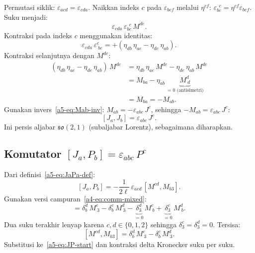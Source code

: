 \vspace{0.5em}
Permutasi siklik: $\varepsilon_{acd} = \varepsilon_{cda}$. Naikkan indeks $c$ pada $\varepsilon_{bef}$ melalui $\eta^{cf}$: $\varepsilon_{be}^{\ \ c} = \eta^{cf}\varepsilon_{bef}$. Suku menjadi:
\begin{equation}
    \varepsilon_{cda}\,\varepsilon_{be}^{\ \ c}\,M^{de}.
\end{equation}
Kontraksi pada indeks $c$ menggunakan identitas:
\begin{equation}
    \varepsilon_{cda}\,\varepsilon^{c}_{\ be} = +(\eta_{db}\,\eta_{ae} - \eta_{de}\,\eta_{ab}).
\end{equation}
Kontraksi selanjutnya dengan $M^{de}$:
\begin{align}
    (\eta_{db}\,\eta_{ae} - \eta_{de}\,\eta_{ab})\,M^{de}
    &= \eta_{db}\,\eta_{ae}\,M^{de} - \eta_{de}\,\eta_{ab}\,M^{de} \nonumber\\[4pt]
    &= M_{ba} - \eta_{ab}\,\underbrace{M^d_{\ d}}_{= 0\text{ (antisimetri)}} \nonumber\\[4pt]
    &= M_{ba} = -M_{ab}. \label{a5-eq:JJ-Mab}
\end{align}
Gunakan invers~\eqref{a5-eq:Mab-inv}: $M_{ab} = -\varepsilon_{abc}\,J^c$, sehingga $-M_{ab} = \varepsilon_{abc}\,J^c$:
\begin{equation}\label{a5-eq:JJ-result}
    [J_a, J_b] = \varepsilon_{abc}\,J^c.
\end{equation}
Ini persis aljabar $\mathfrak{so}(2,1)$ (subaljabar Lorentz), sebagaimana diharapkan.

\subsection{Komutator $[J_a, P_b] = \varepsilon_{abc}\,P^c$}

Dari definisi~\eqref{a5-eq:JaPa-def}:
\begin{equation}\label{a5-eq:JP-start}
    [J_a, P_b] = -\frac{1}{2\ell}\,\varepsilon_{acd}\,[M^{cd}, M_{b3}].
\end{equation}
Gunakan versi campuran~\eqref{a4-eq:comm-mixed}:
\begin{equation}
    [M^{cd}, M_{b3}] = \delta^d_b\,M^c_{\ 3} - \delta^c_b\,M^d_{\ 3}
    - \underbrace{\delta^d_3}_{= 0}\,M^c_{\ b} + \underbrace{\delta^c_3}_{= 0}\,M^d_{\ b}.
\end{equation}
Dua suku terakhir lenyap karena $c, d \in \{0,1,2\}$ sehingga $\delta^c_3 = \delta^d_3 = 0$. Tersisa:
\begin{equation}\label{a5-eq:JP-comm}
    [M^{cd}, M_{b3}] = \delta^d_b\,M^c_{\ 3} - \delta^c_b\,M^d_{\ 3}.
\end{equation}
Substitusi ke~\eqref{a5-eq:JP-start} dan kontraksi delta Kronecker suku per suku.

